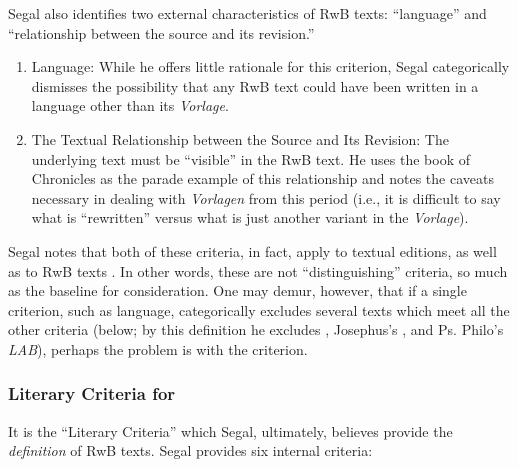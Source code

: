 Segal also identifies two external characteristics of RwB texts: ``language'' and ``relationship between the source and its revision.'' 

 \begin{enumerate}
    \item   Language: While he offers little rationale for this criterion, Segal categorically dismisses the possibility that any RwB text could have been written in a language other than its \emph{Vorlage}.

    \item The Textual Relationship between the Source and Its Revision: The underlying text must be ``visible'' in the RwB text. He uses the book of Chronicles as the parade example of this relationship and notes the caveats necessary in dealing with \emph{Vorlagen} from this period (i.e., it is difficult to say what is ``rewritten'' versus what is just another variant in the \emph{Vorlage}).
\end{enumerate} 

Segal notes that both of these criteria, in fact, apply to textual editions, as well as to RwB texts \autocite[20]{segal_henze2005}. In other words, these are not ``distinguishing'' criteria, so much as the baseline for consideration. One may demur, however, that if a single criterion, such as language, categorically excludes several texts which meet all the other criteria (below; by this definition he excludes \ga, Josephus's \ant, and Ps. Philo's \emph{LAB}), perhaps the problem is with the criterion.

\subsubsection{Literary Criteria for \RWB}

It is the ``Literary Criteria'' which Segal, ultimately, believes provide the \emph{definition} of RwB texts.\autocite[20]{segal_henze2005} Segal provides six internal criteria: 

